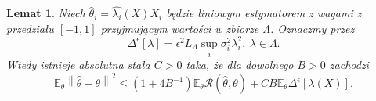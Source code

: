 \documentclass{article}
\newtheorem{lm}{Lemat}
\newcommand{\norm}[1]{\left\lVert#1\right\rVert}
\begin{document}
\begin{lm}\label{lem3}
Niech $\hat{\theta}_i=\hat{\lambda_i}(X)X_i$ będzie liniowym estymatorem z wagami z przedziału $[-1,1]$ przyjmującym wartości w zbiorze $\Lambda$. Oznaczmy przez 
\begin{displaymath}
\Delta^{\epsilon}[\lambda]=\epsilon^2L_{\Lambda}\sup_i\sigma_i^2\lambda_i^2,\ \lambda\in \Lambda.
\end{displaymath}
Wtedy istnieje absolutna stała $C>0$ taka, że dla dowolnego $B>0$ zachodzi
\begin{displaymath}
\mathbb{E}_{\theta}\norm{\hat{\theta}-\theta}^2\leq (1+4B^{-1})\mathbb{E}_{\theta}\mathcal{R}(\hat{\theta},\theta)+CB\mathbb{E}_{\theta}\Delta^{\epsilon}[\lambda (X)].
\end{displaymath}
\end{lm}
\end{document}
